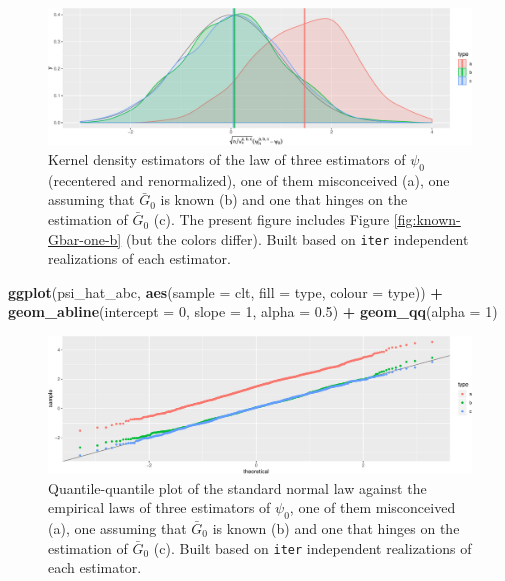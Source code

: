 \documentclass[]{article}
\newenvironment{Shaded}{\begin{snugshade}}{\end{snugshade}}
\newcommand{\DataTypeTok}[1]{\textcolor[rgb]{0.13,0.29,0.53}{#1}}
\newcommand{\DecValTok}[1]{\textcolor[rgb]{0.00,0.00,0.81}{#1}}
\newcommand{\FloatTok}[1]{\textcolor[rgb]{0.00,0.00,0.81}{#1}}
\newcommand{\KeywordTok}[1]{\textcolor[rgb]{0.13,0.29,0.53}{\textbf{#1}}}
\newcommand{\NormalTok}[1]{#1}
\newcommand{\OperatorTok}[1]{\textcolor[rgb]{0.81,0.36,0.00}{\textbf{#1}}}
\newcommand{\StringTok}[1]{\textcolor[rgb]{0.31,0.60,0.02}{#1}}
\newcommand{\Gbar}{\bar{G}}
\theoremstyle{definition}
\theoremstyle{definition}
\theoremstyle{definition}
\theoremstyle{remark}
\begin{document}
\begin{figure}
\centering
\includegraphics{img/unknown-Gbar-three-1.pdf}
\caption{\label{fig:unknown-Gbar-three}Kernel density estimators of the law
of three estimators of \(\psi_{0}\) (recentered and renormalized), one
of them misconceived (a), one assuming that \(\Gbar_{0}\) is known (b)
and one that hinges on the estimation of \(\Gbar_{0}\) (c). The present
figure includes Figure \ref{fig:known-Gbar-one-b} (but the colors
differ). Built based on \texttt{iter} independent realizations of each
estimator.}
\end{figure}

\begin{Shaded}
\begin{Highlighting}[]
\KeywordTok{ggplot}\NormalTok{(psi_hat_abc, }\KeywordTok{aes}\NormalTok{(}\DataTypeTok{sample =}\NormalTok{ clt, }\DataTypeTok{fill =}\NormalTok{ type, }\DataTypeTok{colour =}\NormalTok{ type)) }\OperatorTok{+}
\StringTok{  }\KeywordTok{geom_abline}\NormalTok{(}\DataTypeTok{intercept =} \DecValTok{0}\NormalTok{, }\DataTypeTok{slope =} \DecValTok{1}\NormalTok{, }\DataTypeTok{alpha =} \FloatTok{0.5}\NormalTok{) }\OperatorTok{+}
\StringTok{  }\KeywordTok{geom_qq}\NormalTok{(}\DataTypeTok{alpha =} \DecValTok{1}\NormalTok{)}
\end{Highlighting}
\end{Shaded}

\begin{figure}
\centering
\includegraphics{img/unknown-Gbar-four-1.pdf}
\caption{\label{fig:unknown-Gbar-four}Quantile-quantile plot of the standard
normal law against the empirical laws of three estimators of
\(\psi_{0}\), one of them misconceived (a), one assuming that
\(\Gbar_{0}\) is known (b) and one that hinges on the estimation of
\(\Gbar_{0}\) (c). Built based on \texttt{iter} independent realizations
of each estimator.}
\end{figure}
\end{document}
